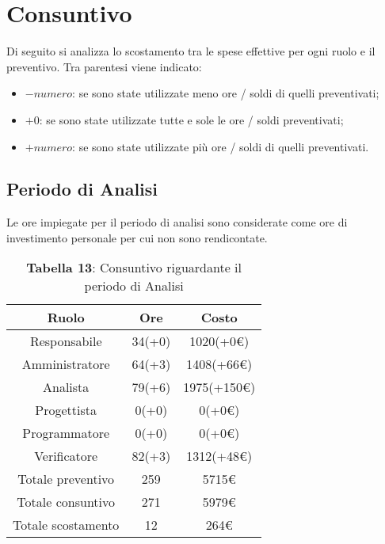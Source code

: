 \section{Consuntivo}
Di seguito si analizza lo scostamento tra le spese effettive per ogni ruolo e il preventivo. Tra parentesi viene indicato:
\begin{itemize}
	\item $-numero$: se sono state utilizzate meno ore / soldi di quelli preventivati;
	\item $+0$: se sono state utilizzate tutte e sole le ore / soldi preventivati;
	\item $+numero$: se sono state utilizzate più ore / soldi di quelli preventivati.
\end{itemize}
\subsection{Periodo di Analisi}
Le ore impiegate per il periodo di analisi sono considerate come ore di investimento personale per cui non sono rendicontate.
\begin{table}[H]
	\centering
	\renewcommand{\arraystretch}{1.5}
	\begin{tabular}{|c|c|c|}
		\hline
		\rowcolor{lighter-grayer}
Ruolo & Ore & Costo \\ \hline
Responsabile & 34(+0) & 1020(+0\euro) \\ \hline
Amministratore & 64(+3) & 1408(+66\euro) \\ \hline
Analista & 79(+6) & 1975(+150\euro) \\ \hline
Progettista & 0(+0) & 0(+0\euro) \\ \hline
Programmatore & 0(+0) & 0(+0\euro) \\ \hline
Verificatore & 82(+3) & 1312(+48\euro) \\ \hline
Totale preventivo & 259 & 5715\euro \\ \hline
Totale consuntivo & 271 & 5979\euro \\ \hline
Totale scostamento & 12 & 264\euro \\ \hline
	\end{tabular}
	\caption*{\textbf{Tabella 13}: Consuntivo riguardante il periodo di Analisi\\}
\end{table}
